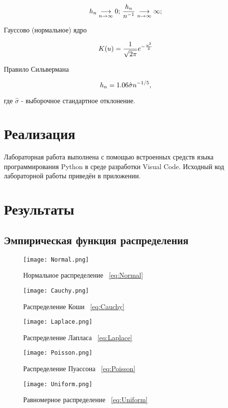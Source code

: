 \documentclass[12pt,a4paper]{scrartcl}
\begin{document}
\begin{equation}
\centering
h_n \underset{n \to \infty}{\longrightarrow} 0;  \, \frac{h_n}{n^{-1}} \underset{n \to \infty}{\longrightarrow} \infty;
\end{equation}

Гауссово (нормальное) ядро

\begin{equation}
\centering
K(u) = \frac{1}{\sqrt{2\pi} } e^{-\frac{u^2}2}
\end{equation}

Правило Сильвермана

\begin{equation}
\centering
h_n = 1.06\hat{\sigma}n^{-1/5},
\end{equation}

где $\hat{\sigma}$ - выборочное стандартное отклонение.

\section {Реализация}
Лабораторная работа выполнена с помощью встроенных средств языка программирования Python в среде разработки Visual Code. Исходный код лабораторной работы приведён в приложении.
 
\section{Результаты}
\subsection{Эмпирическая функция распределения}
\begin{figure}[H]
  \centering
  \texttt{[image: Normal.png]}
  \caption{Нормальное распределение ~\eqref{eq:Normal}}
 
\end{figure}
\begin{figure}[H]
  \centering
  \texttt{[image: Cauchy.png]}
  \caption{Распределение Коши ~\eqref{eq:Cauchy}}
\end{figure}
\begin{figure}[H]
\centering
  \texttt{[image: Laplace.png]}
  \caption{Распределение Лапласа ~\eqref{eq:Laplace}}
\end{figure}
\begin{figure}[H]
  \centering
  \texttt{[image: Poisson.png]}
  \caption{Распределение Пуассона ~\eqref{eq:Poisson}}
\end{figure}
\begin{figure}[H]
  \centering
  \texttt{[image: Uniform.png]}
  \caption{Равномерное распределение ~\eqref{eq:Uniform}}
\end{figure}
\end{document}
